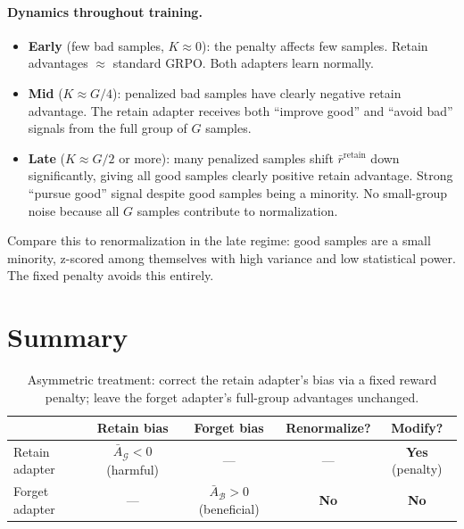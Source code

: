 \documentclass[11pt]{article}
\begin{document}
\paragraph{Dynamics throughout training.}
\begin{itemize}[nosep]
    \item \textbf{Early} (few bad samples, $K \approx 0$): the penalty affects
        few samples. Retain advantages $\approx$ standard GRPO. Both adapters
        learn normally.
    \item \textbf{Mid} ($K \approx G/4$): penalized bad samples have clearly
        negative retain advantage. The retain adapter receives both ``improve
        good'' and ``avoid bad'' signals from the full group of $G$ samples.
    \item \textbf{Late} ($K \approx G/2$ or more): many penalized samples shift
        $\bar{r}^{\text{retain}}$ down significantly, giving all good samples
        clearly positive retain advantage. Strong ``pursue good'' signal despite
        good samples being a minority. No small-group noise because all $G$
        samples contribute to normalization.
\end{itemize}

Compare this to renormalization in the late regime: good samples are a small
minority, z-scored among themselves with high variance and low statistical power.
The fixed penalty avoids this entirely.

\section{Summary}

\begin{table}[h]
\centering
\begin{tabular}{@{}lcccc@{}}
\toprule
 & Retain bias & Forget bias & Renormalize? & Modify? \\
\midrule
Retain adapter & $\bar{A}_{\mathcal{G}} < 0$ (harmful)
    & --- & ---
    & \textbf{Yes} (penalty) \\
Forget adapter & --- & $\bar{A}_{\mathcal{B}} > 0$ (beneficial)
    & \textbf{No}
    & \textbf{No} \\
\bottomrule
\end{tabular}
\caption{Asymmetric treatment: correct the retain adapter's bias via a fixed
    reward penalty; leave the forget adapter's full-group advantages unchanged.}
\end{table}
\end{document}
